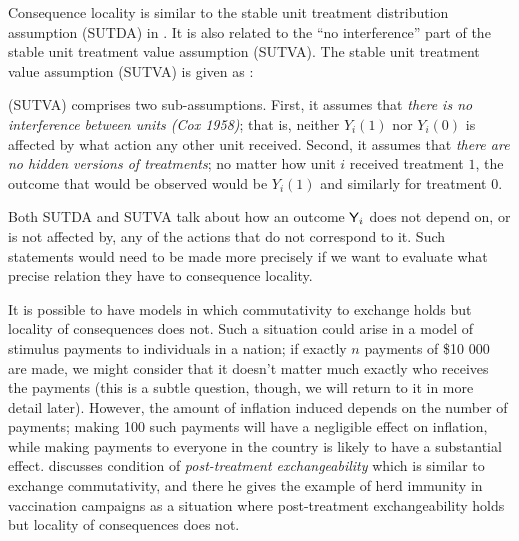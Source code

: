 Consequence locality is similar to the stable unit treatment distribution assumption (SUTDA) in \citet{dawid_decision-theoretic_2020}. It is also related to the ``no interference'' part of the stable unit treatment value assumption (SUTVA). The stable unit treatment value assumption (SUTVA) is given as \citep{rubin_causal_2005}:

\begin{blockquote}
(SUTVA) comprises two sub-assumptions. First, it assumes that \emph{there is no interference between units (Cox 1958)}; that is, neither $Y_i(1)$ nor $Y_i(0)$ is affected by what action any other unit received. Second, it assumes that \emph{there are no hidden versions of treatments}; no matter how unit $i$ received treatment $1$, the outcome that would be observed would be $Y_i(1)$ and similarly for treatment $0$.
\end{blockquote}

Both SUTDA and SUTVA talk about how an outcome $\mathsf{Y}_i$ does not depend on, or is not affected by, any of the actions that do not correspond to it. Such statements would need to be made more precisely if we want to evaluate what precise relation they have to consequence locality.


It is possible to have models in which commutativity to exchange holds but locality of consequences does not. Such a situation could arise in a model of stimulus payments to individuals in a nation; if exactly $n$ payments of \$10 000 are made, we might consider that it doesn't matter much exactly who receives the payments (this is a subtle question, though, we will return to it in more detail later). However, the amount of inflation induced depends on the number of payments; making 100 such payments will have a negligible effect on inflation, while making payments to everyone in the country is likely to have a substantial effect. \citet{dawid_causal_2000} discusses condition of \emph{post-treatment exchangeability} which is similar to exchange commutativity, and there he gives the example of herd immunity in vaccination campaigns as a situation where post-treatment exchangeability holds but locality of consequences does not.



